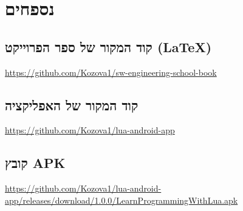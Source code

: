 \chapter{נספחים}

\section{קוד המקור של ספר הפרוייקט (\LaTeX)}
\url{https://github.com/Kozova1/sw-engineering-school-book}

\section{קוד המקור של האפליקציה}
\url{https://github.com/Kozova1/lua-android-app}

\section{קובץ APK}
\url{https://github.com/Kozova1/lua-android-app/releases/download/1.0.0/LearnProgrammingWithLua.apk}
